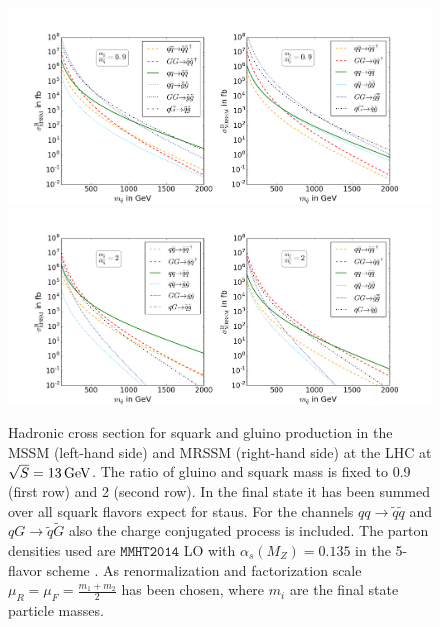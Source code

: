 \begin{figure}[!htpb]
\begin{center}
\includegraphics[scale=.4]{figures/mr=0,9_MSSM+MRSSM}
\includegraphics[scale=.4]{figures/mr=2_MSSM+MRSSM}
\caption{Hadronic cross section for squark and gluino production in the MSSM (left-hand side) and MRSSM (right-hand side) at the LHC at $\sqrt{S} = \unit[13]{GeV}$. The ratio of gluino and squark mass is fixed to 0.9 (first row) and 2 (second row). In the final state it has been summed over all squark flavors expect for staus. For the channels $qq \to \tilde{q}\tilde{q}$ and $qG \to \tilde{q}\tilde{G}$ also the charge conjugated process is included. The parton densities used are $\mathtt{MMHT2014}$ LO with $\alpha_s(M_Z) = 0.135$ in the 5-flavor scheme \cite{Harland-Lang:2014zoa}. As renormalization and factorization scale $\mu_R = \mu_F = \frac{m_1 + m_2}{2}$ has been chosen, where $m_i$ are the final state particle masses.} \label{fig:TreeXsection}
\end{center}
\end{figure}

